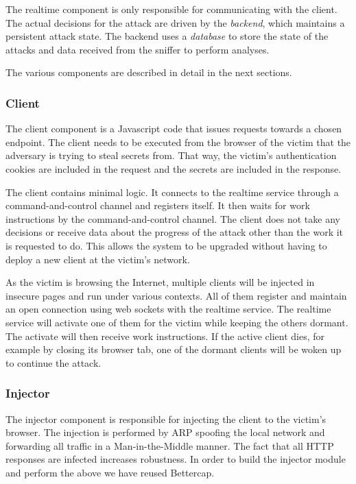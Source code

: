The realtime component is only responsible for communicating with the client.
The actual decisions for the attack are driven by the \textit{backend}, which
maintains a persistent attack state. The backend uses a \textit{database} to
store the state of the attacks and data received from the sniffer to perform
analyses.

The various components are described in detail in the next sections.

\subsubsection{Client}

The client component is a Javascript code that issues requests towards a chosen
endpoint. The client needs to be executed from the browser of the victim that
the adversary is trying to steal secrets from. That way, the victim's
authentication cookies are included in the request and the secrets are included
in the response.

The client contains minimal logic. It connects to the realtime service through a
command-and-control channel and registers itself. It then waits for work
instructions by the command-and-control channel. The client does not take any
decisions or receive data about the progress of the attack other than the work
it is requested to do. This allows the system to be upgraded without having to
deploy a new client at the victim's network.

As the victim is browsing the Internet, multiple clients will be injected in
insecure pages and run under various contexts. All of them register and maintain
an open connection using web sockets with the realtime service. The realtime service
will activate one of them for the victim while keeping the others dormant. The
activate will then receive work instructions. If the active client dies, for
example by closing its browser tab, one of the dormant clients will be woken up
to continue the attack.

\subsubsection{Injector}

The injector component is responsible for injecting the client to the victim's
browser. The injection is performed by ARP spoofing the local network and
forwarding all traffic in a Man-in-the-Middle manner. The fact that all HTTP
responses are infected increases robustness. In order to build the injector
module and perform the above we have reused Bettercap.

